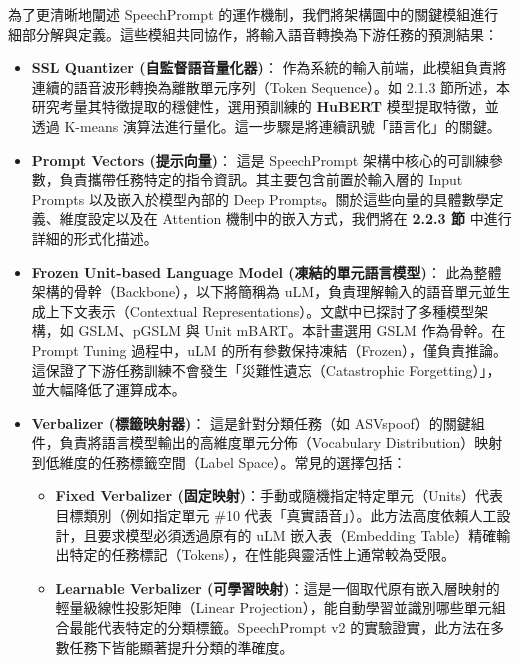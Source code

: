 為了更清晰地闡述 SpeechPrompt 的運作機制，我們將架構圖中的關鍵模組進行細部分解與定義。這些模組共同協作，將輸入語音轉換為下游任務的預測結果：

\begin{itemize}
    \item \textbf{SSL Quantizer (自監督語音量化器)}：
    作為系統的輸入前端，此模組負責將連續的語音波形轉換為離散單元序列（Token Sequence）。如 2.1.3 節所述，本研究考量其特徵提取的穩健性，選用預訓練的 \textbf{HuBERT} 模型提取特徵，並透過 K-means 演算法進行量化。這一步驟是將連續訊號「語言化」的關鍵。
    
    \item \textbf{Prompt Vectors (提示向量)}：
    這是 SpeechPrompt 架構中核心的可訓練參數，負責攜帶任務特定的指令資訊。其主要包含前置於輸入層的 Input Prompts 以及嵌入於模型內部的 Deep Prompts。關於這些向量的具體數學定義、維度設定以及在 Attention 機制中的嵌入方式，我們將在 \textbf{2.2.3 節} 中進行詳細的形式化描述。
    
    \item \textbf{Frozen Unit-based Language Model (凍結的單元語言模型)}：
    此為整體架構的骨幹（Backbone），以下將簡稱為 uLM，負責理解輸入的語音單元並生成上下文表示（Contextual Representations）。文獻中已探討了多種模型架構，如 GSLM、pGSLM 與 Unit mBART。本計畫選用 GSLM 作為骨幹。在 Prompt Tuning 過程中，uLM 的所有參數保持凍結（Frozen），僅負責推論。這保證了下游任務訓練不會發生「災難性遺忘（Catastrophic Forgetting）」，並大幅降低了運算成本。
    
    \item \textbf{Verbalizer (標籤映射器)}：
    這是針對分類任務（如 ASVspoof）的關鍵組件，負責將語言模型輸出的高維度單元分佈（Vocabulary Distribution）映射到低維度的任務標籤空間（Label Space）。常見的選擇包括：
    \begin{itemize}
        \item \textbf{Fixed Verbalizer (固定映射)}：手動或隨機指定特定單元（Units）代表目標類別（例如指定單元 \#10 代表「真實語音」）。此方法高度依賴人工設計，且要求模型必須透過原有的 uLM 嵌入表（Embedding Table）精確輸出特定的任務標記（Tokens），在性能與靈活性上通常較為受限。
        \item \textbf{Learnable Verbalizer (可學習映射)}：這是一個取代原有嵌入層映射的輕量級線性投影矩陣（Linear Projection），能自動學習並識別哪些單元組合最能代表特定的分類標籤。SpeechPrompt v2 的實驗證實，此方法在多數任務下皆能顯著提升分類的準確度。
    \end{itemize}
\end{itemize}

